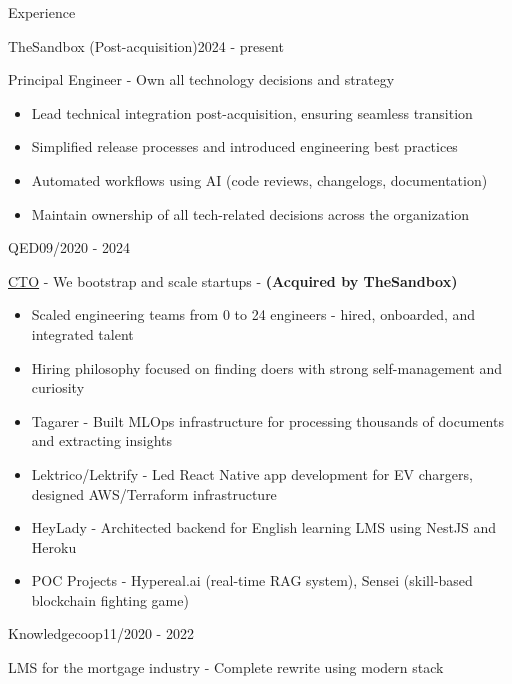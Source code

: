 \documentclass{resume}
\begin{document}
\begin{rSection}{Experience}
    \begin{rSubsection}{TheSandbox (Post-acquisition)}{2024 - present}{}{}
        \item Principal Engineer - Own all technology decisions and strategy
        \begin{itemize}
            \setlength\itemsep{-0.4em}
            \item Lead technical integration post-acquisition, ensuring seamless transition
            \item Simplified release processes and introduced engineering best practices
            \item Automated workflows using AI (code reviews, changelogs, documentation)
            \item Maintain ownership of all tech-related decisions across the organization
        \end{itemize}
    \end{rSubsection}
    \begin{rSubsection}{QED}{09/2020 - 2024}{}{}
        \item \href{https://qed.builders}{CTO} - We bootstrap and scale startups - \textbf{(Acquired by TheSandbox)}
        \begin{itemize}
            \setlength\itemsep{-0.4em}
            \item Scaled engineering teams from 0 to 24 engineers - hired, onboarded, and integrated talent
            \item Hiring philosophy focused on finding doers with strong self-management and curiosity
            \item Tagarer - Built MLOps infrastructure for processing thousands of documents and extracting insights
            \item Lektrico/Lektrify - Led React Native app development for EV chargers, designed AWS/Terraform infrastructure
            \item HeyLady - Architected backend for English learning LMS using NestJS and Heroku
            \item POC Projects - Hypereal.ai (real-time RAG system), Sensei (skill-based blockchain fighting game)
        \end{itemize}
    \end{rSubsection}
    \begin{rSubsection}{Knowledgecoop}{11/2020 - 2022}{}{}
        \item LMS for the mortgage industry - Complete rewrite using modern stack

\end{rSubsection}
\end{rSection}
\end{document}
